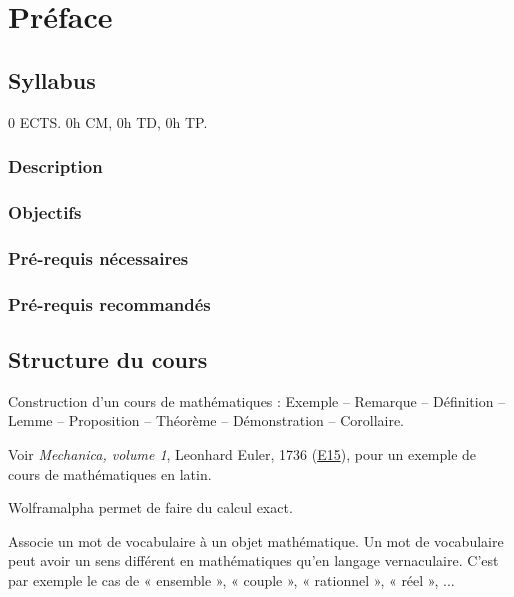 
\chapter*{Préface}


\section*{Syllabus}

0 ECTS. 0h CM, 0h TD, 0h TP.

\subsection*{Description}

\subsection*{Objectifs}

\subsection*{Pré-requis nécessaires}

\subsection*{Pré-requis recommandés}

\section*{Structure du cours}

Construction d'un cours de mathématiques : Exemple -- Remarque -- Définition -- Lemme -- Proposition -- Théorème -- Démonstration -- Corollaire.

Voir \emph{Mechanica, volume 1}, Leonhard Euler, 1736 (\href{https://scholarlycommons.pacific.edu/euler-works/15/}{E15}), pour un exemple de cours de mathématiques en latin.

Wolframalpha permet de faire du calcul exact.

\begin{definition*}
Associe un mot de vocabulaire à un objet mathématique.
Un mot de vocabulaire peut avoir un sens différent en mathématiques qu'en langage vernaculaire.
C'est par exemple le cas de « ensemble », « couple », « rationnel », « réel », ...
\end{definition*}

